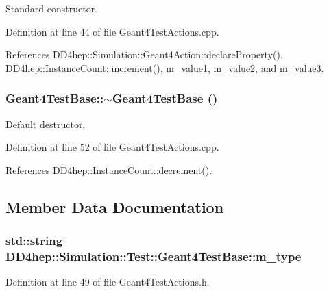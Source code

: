 Standard constructor. 

Definition at line 44 of file Geant4TestActions.cpp.

References DD4hep::Simulation::Geant4Action::declareProperty(), DD4hep::InstanceCount::increment(), m\_\-value1, m\_\-value2, and m\_\-value3.\hypertarget{class_d_d4hep_1_1_simulation_1_1_test_1_1_geant4_test_base_aa2aa8fa1fb375f02c3fa54116c90ef27}{
\subsubsection[{$\sim$Geant4TestBase}]{\setlength{\rightskip}{0pt plus 5cm}Geant4TestBase::$\sim$Geant4TestBase ()}}
\label{class_d_d4hep_1_1_simulation_1_1_test_1_1_geant4_test_base_aa2aa8fa1fb375f02c3fa54116c90ef27}


Default destructor. 

Definition at line 52 of file Geant4TestActions.cpp.

References DD4hep::InstanceCount::decrement().

\subsection{Member Data Documentation}
\hypertarget{class_d_d4hep_1_1_simulation_1_1_test_1_1_geant4_test_base_aadfad14d5fb2fa03ca24c8ed07ec190d}{
\subsubsection[{m\_\-type}]{\setlength{\rightskip}{0pt plus 5cm}std::string {\bf DD4hep::Simulation::Test::Geant4TestBase::m\_\-type}}}
\label{class_d_d4hep_1_1_simulation_1_1_test_1_1_geant4_test_base_aadfad14d5fb2fa03ca24c8ed07ec190d}


Definition at line 49 of file Geant4TestActions.h.

